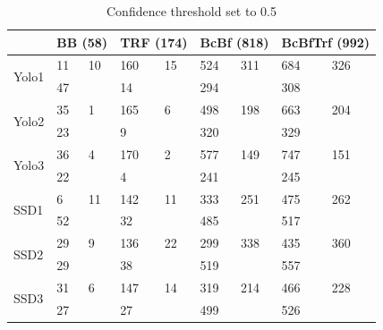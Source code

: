 \begin{table}[h!]
\centering
\begin{tabular}{l|ll|ll|ll|ll}
                       & \multicolumn{2}{l|}{BB (58)} & \multicolumn{2}{l|}{TRF (174)} & \multicolumn{2}{l|}{BcBf (818)} & \multicolumn{2}{l|}{BcBfTrf (992)} \\ \hline
\multirow{2}{*}{Yolo1} & 11            & 10           & 160            & 15            & 524            & 311            & 684              & 326             \\
                       & 47            &              & 14             &               & 294            &                & 308              &                 \\ \hline
\multirow{2}{*}{Yolo2} & 35            & 1            & 165            & 6             & 498            & 198            & 663              & 204             \\
                       & 23            &              & 9              &               & 320            &                & 329              &                 \\ \hline
\multirow{2}{*}{Yolo3} & 36            & 4            & 170            & 2             & 577            & 149            & 747              & 151             \\
                       & 22            &              & 4              &               & 241            &                & 245              &                 \\ \hline
\multirow{2}{*}{SSD1}  & 6             & 11           & 142            & 11            & 333            & 251            & 475              & 262             \\
                       & 52            &              & 32             &               & 485            &                & 517              &                 \\ \hline
\multirow{2}{*}{SSD2}  & 29            & 9            & 136            & 22            & 299            & 338            & 435              & 360             \\
                       & 29            &              & 38             &               & 519            &                & 557              &                 \\ \hline
\multirow{2}{*}{SSD3}  & 31            & 6            & 147            & 14            & 319            & 214            & 466              & 228             \\
                       & 27            &              & 27             &               & 499            &                & 526              &                
\end{tabular}
\caption{Confidence threshold set to 0.5}
\end{table}

